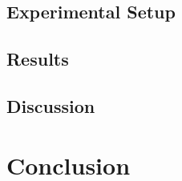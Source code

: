 \documentclass[sigconf,review,anonymous]{acmart}
\begin{document}
\subsection{Experimental Setup}

\subsection{Results}

\subsection{Discussion}

\section{Conclusion}



\end{document}
